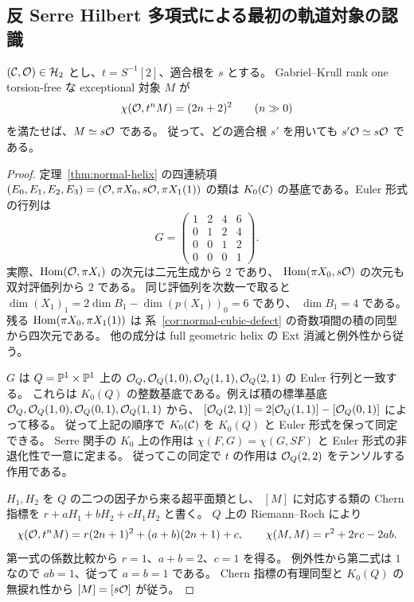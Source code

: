 \subsection{反 Serre Hilbert 多項式による最初の軌道対象の認識}
\label{sec:first-orbit-object}

\begin{proposition}
\label{prop:first-orbit-object}
$(\mathcal C,\mathcal O)\in\mathcal H_2$ とし、$t=S^{-1}[2]$、適合根を $s$ とする。
Gabriel--Krull rank one torsion-free な exceptional 対象 $M$ が
\[
 \chi(\mathcal O,t^n M)=(2n+2)^2\qquad(n\gg0)
\]
を満たせば、$M\simeq s\mathcal O$ である。
従って、どの適合根 $s'$ を用いても $s'\mathcal O\simeq s\mathcal O$ である。
\end{proposition}

\begin{proof}
定理~\ref{thm:normal-helix} の四連続項
$(E_0,E_1,E_2,E_3)=(\mathcal O,\pi X_0,s\mathcal O,\pi X_1(1))$
の類は $K_0(\mathcal C)$ の基底である。Euler 形式の行列は
\[
 G=\begin{pmatrix}
 1&2&4&6\\
 0&1&2&4\\
 0&0&1&2\\
 0&0&0&1
 \end{pmatrix}.
\]
実際、$\operatorname{Hom}(\mathcal O,\pi X_i)$ の次元は二元生成から $2$ であり、
$\operatorname{Hom}(\pi X_0,s\mathcal O)$ の次元も双対評価列から $2$ である。
同じ評価列を次数一で取ると $\dim (X_1)_1=2\dim B_1-\dim(p(X_1))_0=6$ であり、
$\dim B_1=4$ である。
残る $\operatorname{Hom}(\pi X_0,\pi X_1(1))$ は
系~\ref{cor:normal-cubic-defect} の奇数項間の積の同型から四次元である。
他の成分は full geometric helix の Ext 消滅と例外性から従う。

$G$ は $Q=\mathbb P^1\times\mathbb P^1$ 上の
$\mathcal O_Q,\mathcal O_Q(1,0),\mathcal O_Q(1,1),\mathcal O_Q(2,1)$ の Euler 行列と一致する。
これらは $K_0(Q)$ の整数基底である。例えば積の標準基底
$\mathcal O_Q,\mathcal O_Q(1,0),\mathcal O_Q(0,1),\mathcal O_Q(1,1)$ から、
$[\mathcal O_Q(2,1)]=2[\mathcal O_Q(1,1)]-[\mathcal O_Q(0,1)]$ によって移る。
従って上記の順序で $K_0(\mathcal C)$ を $K_0(Q)$ と Euler 形式を保って同定できる。
Serre 関手の $K_0$ 上の作用は
$\chi(F,G)=\chi(G,SF)$ と Euler 形式の非退化性で一意に定まる。
従ってこの同定で $t$ の作用は $\mathcal O_Q(2,2)$ をテンソルする作用である。

$H_1,H_2$ を $Q$ の二つの因子から来る超平面類とし、
$[M]$ に対応する類の Chern 指標を
$r+aH_1+bH_2+cH_1H_2$ と書く。
$Q$ 上の Riemann--Roch により
\[
 \chi(\mathcal O,t^n M)=r(2n+1)^2+(a+b)(2n+1)+c,\qquad
 \chi(M,M)=r^2+2rc-2ab.
\]
第一式の係数比較から $r=1$、$a+b=2$、$c=1$ を得る。
例外性から第二式は $1$ なので $ab=1$、従って $a=b=1$ である。
Chern 指標の有理同型と $K_0(Q)$ の無捩れ性から $[M]=[s\mathcal O]$ が従う。


\end{proof}
